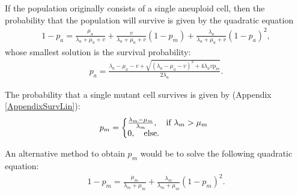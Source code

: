 \documentclass[12pt]{extarticle}
\begin{document}
If the population originally consists of a single aneuploid cell, then the probability that the population will survive is given by the quadratic equation
\begin{align}
1-p_a=\frac{\mu_a}{\lambda_a+\mu_a+v}+\frac{v}{\lambda_a+\mu_a+v}\left(1-p_m\right)+\frac{\lambda_a}{\lambda_a+\mu_a+v}\left(1-p_a\right)^2,
\end{align}
whose smallest solution is the survival probability:
\begin{align}\label{survproba}
p_a=\frac{\lambda_a-\mu_a-v+\sqrt{\left(\lambda_a-\mu_a-v\right)^2+4\lambda_avp_m}}{2\lambda_a}.
\end{align}

The probability that a single mutant cell survives is given by (Appendix \ref{AppendixSurvLin}):
\begin{equation}
p_m = \left\{
  \begin{array}{@{}ll@{}}
  \frac{\lambda_m-\mu_m}{\lambda_m},\quad \text{if }\lambda_m>\mu_m \\
   0,\quad \text{else} .
  \end{array}\right .
\end{equation}

An alternative method to obtain $p_m$ would be to solve the following quadratic equation:
\begin{align}
1-p_m=\frac{\mu_m}{\lambda_m+\mu_m}+\frac{\lambda_m}{\lambda_m+\mu_m}\left(1-p_m\right)^2.
\end{align}
\end{document}
